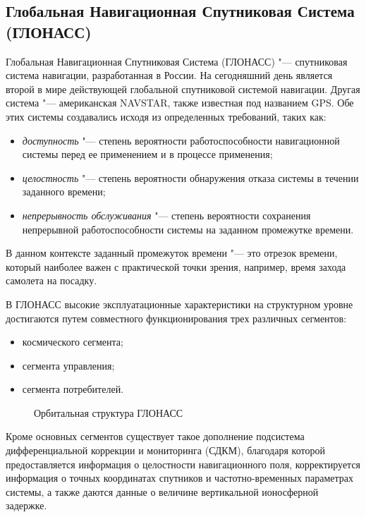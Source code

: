 \documentclass[../main.tex]{subfiles}
\begin{document}
\subsection{Глобальная Навигационная Спутниковая Система (ГЛОНАСС)}
Глобальная Навигационная Спутниковая Система (ГЛОНАСС) "--- спутниковая система навигации, разработанная в России. На сегодняшний день является второй в мире действующей глобальной спутниковой системой навигации. Другая система "--- американская NAVSTAR, также известная под названием GPS. Обе этих системы создавались исходя из определенных требований, таких как:
\begin{itemize}
    \item \textit{доступность} "--- степень вероятности работоспособности навигационной системы перед ее применением и в процессе применения;
    \item \textit{целостность} "--- степень вероятности обнаружения отказа системы в течении заданного времени;
    \item \textit{непрерывность обслуживания} "--- степень вероятности сохранения непрерывной работоспособности системы на заданном промежутке времени.
\end{itemize}
В данном контексте заданный промежуток времени "--- это отрезок времени, который наиболее важен с практической точки зрения, например, время захода самолета на посадку.

В ГЛОНАСС высокие эксплуатационные характеристики на структурном уровне достигаются путем совместного функционирования трех различных сегментов:
\begin{itemize}
    \item космического сегмента;
    \item сегмента управления;
    \item сегмента потребителей.
\end{itemize}

\begin{figure}[tb]
    \begin{center}


    \caption{Орбитальная структура ГЛОНАСС}
    \label{fig:glonass:pic1}
    \end{center}
\end{figure}

Кроме основных сегментов существует такое дополнение подсистема дифференциальной коррекции и мониторинга (СДКМ), благодаря которой предоставляется информация о целостности навигационного поля, корректируется информация о точных координатах спутников и частотно-временных параметрах системы, а также даются данные о величине вертикальной ионосферной задержке.
\end{document}
